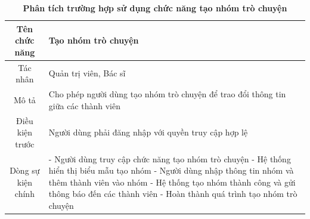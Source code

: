 \begin{table}[H]
	\caption{\bfseries \fontsize{12pt}{0pt}\selectfont Phân tích trường hợp sử dụng chức năng tạo nhóm trò chuyện}
	\centering
	\begin{tabularx}{0.9\textwidth}{|c|X|}
		\hline
		\textbf{Tên chức năng} & \textbf{Tạo nhóm trò chuyện}                                                      \\
		\hline
		Tác nhân               & Quản trị viên, Bác sĩ                                                             \\
		\hline
		Mô tả                  & Cho phép người dùng tạo nhóm trò chuyện để trao đổi thông tin giữa các thành viên \\
		\hline
		Điều kiện trước        & Người dùng phải đăng nhập với quyền truy cập hợp lệ                               \\
		\hline
		Dòng sự kiện chính     &
		- Người dùng truy cập chức năng tạo nhóm trò chuyện \newline
		- Hệ thống hiển thị biểu mẫu tạo nhóm \newline
		- Người dùng nhập thông tin nhóm và thêm thành viên vào nhóm \newline
		- Hệ thống tạo nhóm thành công và gửi thông báo đến các thành viên \newline
		- Hoàn thành quá trình tạo nhóm trò chuyện                                                                 \\
		\hline
	\end{tabularx}
\end{table}


\newpage